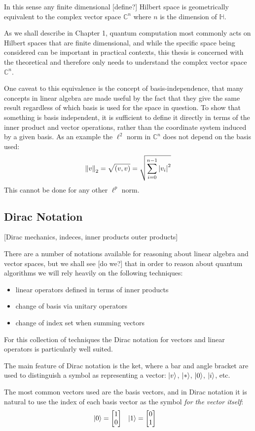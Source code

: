 In this sense any finite dimensional [define?] Hilbert space is geometrically equivalent to the complex vector space $\mathbb{C}^n$ where $n$ is the dimension of $\mathbb{H}$.

As we shall describe in Chapter 1, quantum computation most commonly acts on Hilbert spaces that are finite dimensional, and while the specific space being considered can be important in practical contexts, this thesis is concerned with the theoretical and therefore only needs to understand the complex vector space $\mathbb{C}^n$.

One caveat to this equivalence is the concept of basis-independence, that many concepts in linear algebra are made useful by the fact that they give the same result regardless of which basis is used for the space in question. To show that something is basis independent, it is sufficient to define it directly in terms of the inner product and vector operations, rather than the coordinate system induced by a given basis. As an example the $\ell^2$ norm in $\mathbb{C}^n$ does not depend on the basis used:
\[\left\Vert v \right\Vert_2 = \sqrt{(v, v)} = \sqrt{\sum_{i=0}^{n-1}\left| v_i \right|^2}\]
This cannot be done for any other $\ell^p$ norm.

\subsection{Dirac Notation}
[Dirac mechanics, indeces, inner products outer products]

There are a number of notations available for reasoning about linear algebra and vector spaces, but we shall see [do we?] that in order to reason about quantum algorithms we will rely heavily on the following techniques:
\begin{itemize}
	\item linear operators defined in terms of inner products
	\item change of basis via unitary operators
	\item change of index set when summing vectors
\end{itemize}
For this collection of techniques the Dirac notation for vectors and linear operators is particularly well suited.

The main feature of Dirac notation is the ket, where a bar and angle bracket are used to distinguish a symbol as representing a vector: $| v \rangle$, $| * \rangle$, $| 0 \rangle$, $| i \rangle$, etc.

The most common vectors used are the basis vectors, and in Dirac notation it is natural to use the index of each basis vector as the symbol \textit{for the vector itself}:
\begin{align*}
	| 0 \rangle = \left[\begin{matrix}
		1\\
		0
	\end{matrix}\right]
	&&&
	| 1 \rangle = \left[\begin{matrix}
		0\\
		1
	\end{matrix}\right]
\end{align*}

